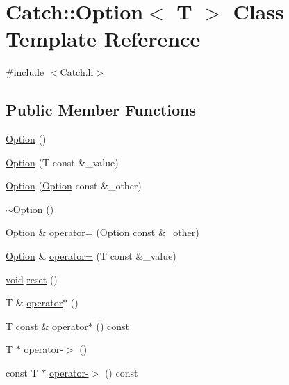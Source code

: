 \hypertarget{class_catch_1_1_option}{}\section{Catch\+:\+:Option$<$ T $>$ Class Template Reference}
\label{class_catch_1_1_option}


{\ttfamily \#include $<$Catch.\+h$>$}

\subsection*{Public Member Functions}
\begin{DoxyCompactItemize}
\item 
\hyperlink{class_catch_1_1_option_a8efb01b593d798decc80cbbdf311f2a3}{Option} ()
\item 
\hyperlink{class_catch_1_1_option_a5aeb9c22d48a6882bdf5fb4730b06c86}{Option} (T const \&\+\_\+value)
\item 
\hyperlink{class_catch_1_1_option_af02f2e4559f06384baec0def8c68c5fd}{Option} (\hyperlink{class_catch_1_1_option}{Option} const \&\+\_\+other)
\item 
\hyperlink{class_catch_1_1_option_a37fe90bb47bb909f150a5ad6be25581a}{$\sim$\+Option} ()
\item 
\hyperlink{class_catch_1_1_option}{Option} \& \hyperlink{class_catch_1_1_option_a78c65b15dd6b2fbd04c5012c43017c8f}{operator=} (\hyperlink{class_catch_1_1_option}{Option} const \&\+\_\+other)
\item 
\hyperlink{class_catch_1_1_option}{Option} \& \hyperlink{class_catch_1_1_option_a2be7e343ab22d6061726d32ab4622653}{operator=} (T const \&\+\_\+value)
\item 
\hyperlink{_s_d_l__opengles2__gl2ext_8h_ae5d8fa23ad07c48bb609509eae494c95}{void} \hyperlink{class_catch_1_1_option_a37b4e0e5d4d56296adacd267a616f4e0}{reset} ()
\item 
T \& \hyperlink{class_catch_1_1_option_afd989852fa453731c3190dac63caccb0}{operator$\ast$} ()
\item 
T const \& \hyperlink{class_catch_1_1_option_a0f05708905dc6b0b470fb24f5d265631}{operator$\ast$} () const 
\item 
T $\ast$ \hyperlink{class_catch_1_1_option_acad340798a16c8f700f8763119e90f31}{operator-\/$>$} ()
\item 
const T $\ast$ \hyperlink{class_catch_1_1_option_a0800340b2971748671b88acfb14bb928}{operator-\/$>$} () const 
\item 

\end{DoxyCompactItemize}
